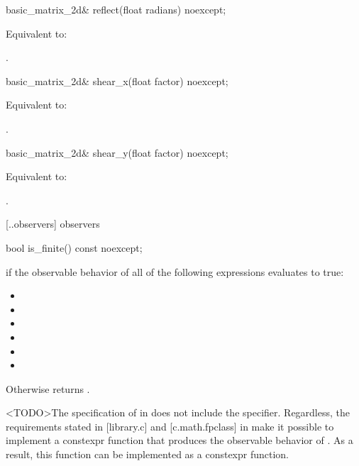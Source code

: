 %
\begin{itemdecl}
basic_matrix_2d& reflect(float radians) noexcept;
\end{itemdecl}
\begin{itemdescr}
\pnum
\effects
Equivalent to: 

\pnum
\returns
{}.
\end{itemdescr}

%
\begin{itemdecl}
basic_matrix_2d& shear_x(float factor) noexcept;
\end{itemdecl}
\begin{itemdescr}
\pnum
\effects
Equivalent to: 

\pnum
\returns
{}.
\end{itemdescr}

%
\begin{itemdecl}
basic_matrix_2d& shear_y(float factor) noexcept;
\end{itemdecl}
\begin{itemdescr}
\pnum
\effects
Equivalent to: 

\pnum
\returns
{}.
\end{itemdescr}

 [\iotwod.\matrixtwod.observers] { observers}

%
\begin{itemdecl}
bool is_finite() const noexcept;
\end{itemdecl}
\begin{itemdescr}
\pnum
\returns
{} if the observable behavior of all of the following expressions evaluates to true:
\begin{itemize}
\item {}
\item {}
\item {}
\item {}
\item {}
\item {}
\end{itemize}

\pnum
Otherwise returns .

\pnum
\begin{note}
<TODO>The specification of  in \cppseventeen does not include the  specifier. Regardless, the requirements stated in [library.c] and [c.math.fpclass] in \cppseventeen make it possible to implement a constexpr function that produces the observable behavior of . As a result, this function can be implemented as a constexpr function.
\end{note}
\end{itemdescr}

